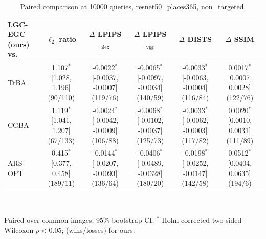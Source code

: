 \begin{table}[t]
\centering\footnotesize
\caption{Paired comparison at 10000 queries, resnet50\_places365, non\_targeted.}
\begin{tabular}{lccccc}
\toprule
LGC-EGC (ours) vs. & $\ell_2$ ratio & $\Delta$ LPIPS$_{\mathrm{alex}}$ & $\Delta$ LPIPS$_{\mathrm{vgg}}$ & $\Delta$ DISTS & $\Delta$ SSIM \\
\midrule
TtBA & 1.107$^{*}$ [1.028, 1.196] (90/110) & -0.0022$^{*}$ [-0.0037, -0.0007] (119/76) & -0.0065$^{*}$ [-0.0097, -0.0034] (140/59) & -0.0033$^{*}$ [-0.0063, -0.0004] (116/84) & 0.0017$^{*}$ [0.0007, 0.0028] (122/76) \\
CGBA & 1.119$^{*}$ [1.041, 1.207] (67/133) & -0.0024$^{*}$ [-0.0042, -0.0009] (106/88) & -0.0068$^{*}$ [-0.0102, -0.0037] (125/73) & -0.0033$^{*}$ [-0.0062, -0.0003] (117/82) & 0.0020$^{*}$ [0.0010, 0.0031] (111/89) \\
ARS-OPT & 0.415$^{*}$ [0.377, 0.458] (189/11) & -0.0144$^{*}$ [-0.0207, -0.0093] (136/64) & -0.0406$^{*}$ [-0.0489, -0.0328] (180/20) & -0.0198$^{*}$ [-0.0252, -0.0147] (142/58) & 0.0512$^{*}$ [0.0404, 0.0635] (194/6) \\
\bottomrule
\end{tabular}
\\[2pt]\parbox{\linewidth}{\scriptsize Paired over common images; 95\% bootstrap CI; $^{*}$ Holm-corrected two-sided Wilcoxon $p<0.05$; (wins/losses) for ours.}
\end{table}
